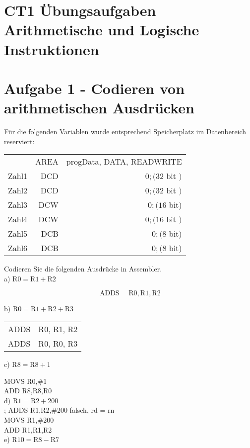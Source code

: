 \documentclass[10pt]{article}
\begin{document}
\section*{CT1 Übungsaufgaben Arithmetische und Logische Instruktionen}
\section*{Aufgabe 1 - Codieren von arithmetischen Ausdrücken}
Für die folgenden Variablen wurde entsprechend Speicherplatz im Datenbereich reserviert:

\begin{center}
\begin{tabular}{lrr}
 & AREA & progData, DATA, READWRITE \\
Zahl1 & DCD & $0 ;(32$ bit $)$ \\
Zahl2 & DCD & $0 ;(32$ bit $)$ \\
Zahl3 & DCW & $0 ;(16$ bit) \\
Zahl4 & DCW & $0 ;(16$ bit $)$ \\
Zahl5 & DCB & $0 ;(8$ bit) \\
Zahl6 & DCB & $0 ;(8$ bit) \\
\end{tabular}
\end{center}

Codieren Sie die folgenden Ausdrücke in Assembler.\\
a) $\mathrm{R} 0=\mathrm{R} 1+\mathrm{R} 2$

$$
\text { ADDS } \quad \mathrm{R} 0, \mathrm{R} 1, \mathrm{R} 2
$$

b) $\mathrm{R} 0=\mathrm{R} 1+\mathrm{R} 2+\mathrm{R} 3$

\begin{center}
\begin{tabular}{ll}
ADDS & R0, R1, R2 \\
ADDS & R0, R0, R3 \\
\end{tabular}
\end{center}

c) $\mathrm{R} 8=\mathrm{R} 8+1$

MOVS R0,\#1\\
ADD R8,R8,R0\\
d) $\mathrm{R} 1=\mathrm{R} 2+200$\\
; ADDS R1,R2,\#200 falsch, rd = rn\\
MOVS R1,\#200\\
ADD R1,R1,R2\\
e) $\mathrm{R} 10=\mathrm{R} 8-\mathrm{R} 7$
\end{document}
